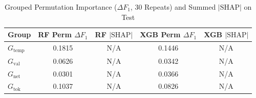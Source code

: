 \begin{table}[!htbp]
\centering
\caption{Grouped Permutation Importance ($\Delta F_1$, 30 Repeats) and Summed $|\text{SHAP}|$ on Test}
\label{tab:group_imp}
\footnotesize
\begin{tabularx}{\linewidth}{l c c c c}
\toprule
\textbf{Group} & \textbf{RF Perm $\Delta F_1$} & \textbf{RF $|\text{SHAP}|$} & \textbf{XGB Perm $\Delta F_1$} & \textbf{XGB $|\text{SHAP}|$} \\
\midrule
$G_{\text{temp}}$ & 0.1815 & N/A & 0.1446 & N/A \\
$G_{\text{val}}$ & 0.0626 & N/A & 0.0342 & N/A \\
$G_{\text{net}}$ & 0.0301 & N/A & 0.0366 & N/A \\
$G_{\text{tok}}$ & 0.1037 & N/A & 0.0826 & N/A \\
\bottomrule
\end{tabularx}
\end{table}